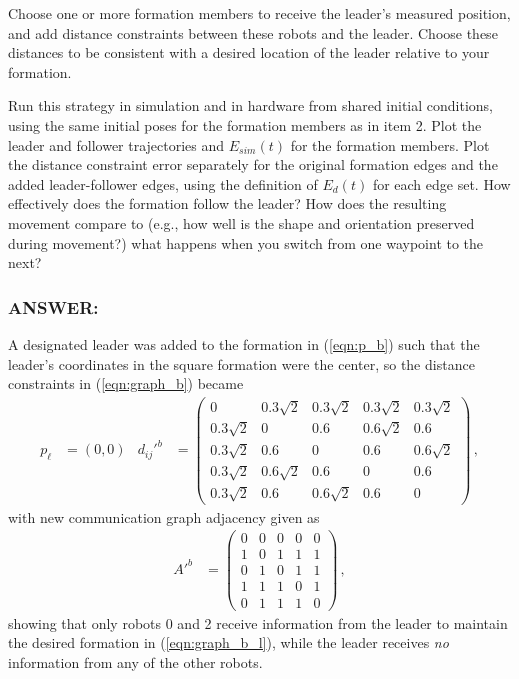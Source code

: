 \documentclass[11pt]{article}
\begin{document}
Choose one or more formation members to receive the leader's measured position, and add distance constraints between these robots and the leader. Choose these distances to be consistent with a desired location of the leader relative to your formation.

Run this strategy in simulation and in hardware from shared initial conditions, using the same initial poses for the formation members as in item 2. Plot the leader and follower trajectories and $E_{sim}(t)$ for the formation members. Plot the distance constraint error separately for the original formation edges and the added leader-follower edges, using the definition of $E_d(t)$ for each edge set. How effectively does the formation follow the leader? How does the resulting movement compare to (e.g., how well is the shape and orientation preserved during movement?) what happens when you switch from one waypoint to the next?

\subsubsection*{ANSWER:}
A designated leader was added to the formation in (\ref{eqn:p_b}) such that the leader's coordinates in the square formation were the center, so the distance constraints in (\ref{eqn:graph_b}) became
\begin{align}\label{eqn:graph_b_l}
    p_\ell&=(0,0) & d_{ij}'^b&=\begin{pmatrix}
        0 & 0.3\sqrt 2 & 0.3\sqrt 2 & 0.3\sqrt 2 & 0.3\sqrt 2\\
        0.3\sqrt 2 & 0 & 0.6 & 0.6\sqrt 2 & 0.6\\
        0.3\sqrt 2 & 0.6 & 0 & 0.6 & 0.6\sqrt 2\\
        0.3\sqrt 2 & 0.6\sqrt 2 & 0.6 & 0 & 0.6\\
        0.3\sqrt 2 & 0.6 & 0.6\sqrt 2 & 0.6 & 0
    \end{pmatrix}\,,
\end{align}
with new communication graph adjacency given as
\begin{align*}
    A'^b&=\begin{pmatrix}
        0 & 0 & 0 & 0 & 0\\
        1 & 0 & 1 & 1 & 1\\
        0 & 1 & 0 & 1 & 1\\
        1 & 1 & 1 & 0 & 1\\
        0 & 1 & 1 & 1 & 0
    \end{pmatrix}\,,
\end{align*}
showing that only robots 0 and 2 receive information from the leader to maintain the desired formation in (\ref{eqn:graph_b_l}), while the leader receives \textit{no} information from any of the other robots.
\end{document}
